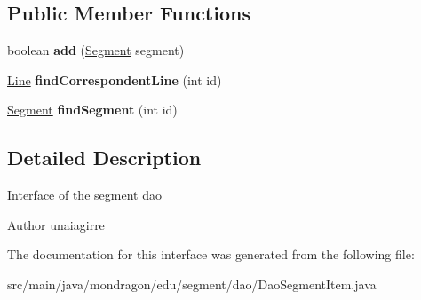 \subsection*{Public Member Functions}
\begin{DoxyCompactItemize}
\item 
\mbox{\label{interfacemondragon_1_1edu_1_1segment_1_1dao_1_1_dao_segment_item_abfe256e236f4f55e126d08657fd6da03}} 
boolean {\bfseries add} (\mbox{\hyperlink{classmondragon_1_1edu_1_1clases_1_1_segment}{Segment}} segment)
\item 
\mbox{\label{interfacemondragon_1_1edu_1_1segment_1_1dao_1_1_dao_segment_item_ac7cd3451ab77c27d7de64de17974f0ac}} 
\mbox{\hyperlink{classmondragon_1_1edu_1_1clases_1_1_line}{Line}} {\bfseries find\+Correspondent\+Line} (int id)
\item 
\mbox{\label{interfacemondragon_1_1edu_1_1segment_1_1dao_1_1_dao_segment_item_a93c90b458cef140fc895cc36cd0ffd21}} 
\mbox{\hyperlink{classmondragon_1_1edu_1_1clases_1_1_segment}{Segment}} {\bfseries find\+Segment} (int id)
\end{DoxyCompactItemize}


\subsection{Detailed Description}
Interface of the segment dao

\begin{DoxyAuthor}{Author}
unaiagirre 
\end{DoxyAuthor}


The documentation for this interface was generated from the following file\+:\begin{DoxyCompactItemize}
\item 
src/main/java/mondragon/edu/segment/dao/Dao\+Segment\+Item.\+java\end{DoxyCompactItemize}
